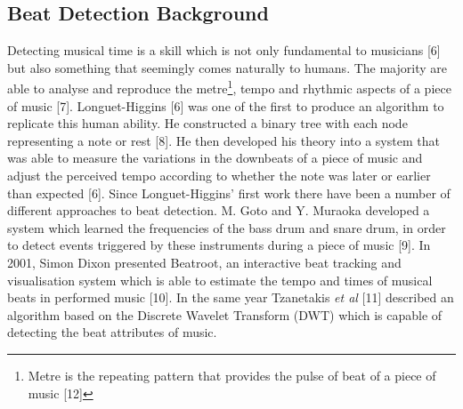 \documentclass[a4paper, 11pt]{article}
\begin{document}
\subsection{Beat Detection Background}

Detecting musical time is a skill which is not only fundamental to musicians [6] but also something that seemingly comes naturally to humans. The majority are able to analyse and reproduce the metre\footnote{Metre is the repeating pattern that provides the pulse of beat of a piece of music [12]}, tempo and rhythmic aspects of a piece of music [7]. Longuet-Higgins [6] was one of the first to produce an algorithm to replicate this human ability. He constructed a binary tree with each node representing a note or rest [8]. He then developed his theory into a system that was able to measure the variations in the downbeats of a piece of music and adjust the perceived tempo according to whether the note was later or earlier than expected [6]. Since Longuet-Higgins' first work there have been a number of different approaches to beat detection. M. Goto and Y. Muraoka developed a system which learned the frequencies of the bass drum and snare drum, in order to detect events triggered by these instruments during a piece of music [9]. In 2001, Simon Dixon presented Beatroot, an interactive beat tracking and visualisation system which is able to estimate the tempo and times of musical beats in performed music [10]. In the same year Tzanetakis \textit{et al} [11] described an algorithm based on the Discrete Wavelet Transform (DWT) which is capable of detecting the beat attributes of music. 


\end{document}
